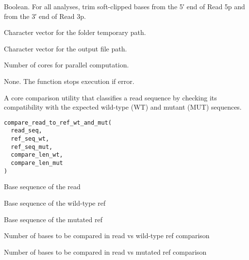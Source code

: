 \documentclass[a4paper]{book}
\begin{document}
\begin{Arguments}
\begin{ldescription}
\item[\code{remove\_softclip}] Boolean. For all analyses, trim soft-clipped bases from the 5′ end of Read 5p and from the 3′ end of Read 3p.

\item[\code{tmp\_folder}] Character vector for the folder temporary path.

\item[\code{output\_file}] Character vector for the output file path.

\item[\code{n\_cores}] Number of cores for parallel computation.
\end{ldescription}
\end{Arguments}
%
\begin{Value}
None. The function stops execution if error.
\end{Value}
%
\begin{Description}
A core comparison utility that classifies a read sequence by checking its compatibility with the
expected wild-type (WT) and mutant (MUT) sequences.
\end{Description}
%
\begin{Usage}
\begin{verbatim}
compare_read_to_ref_wt_and_mut(
  read_seq,
  ref_seq_wt,
  ref_seq_mut,
  compare_len_wt,
  compare_len_mut
)
\end{verbatim}
\end{Usage}
%
\begin{Arguments}
\begin{ldescription}
\item[\code{read\_seq}] Base sequence of the read

\item[\code{ref\_seq\_wt}] Base sequence of the wild-type ref

\item[\code{ref\_seq\_mut}] Base sequence of the mutated ref

\item[\code{compare\_len\_wt}] Number of bases to be compared in read vs wild-type ref comparison

\item[\code{compare\_len\_mut}] Number of bases to be compared in read vs mutated ref comparison
\end{ldescription}
\end{Arguments}
\end{document}
